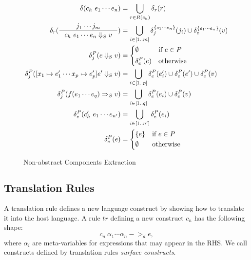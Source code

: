 \begin{figure}
    \begin{align*}
        \delta(c_h~e_1\cdots e_n) & = \bigcup_{r\in R(c_h)} \delta_r(r) \\
        \delta_r(\inference{j_1\cdots j_m}{c_h~e_1\cdots e_n \Da_S v}) & = 
            \bigcup_{i\in [1..m]}\delta_j^{\{e_1\cdots e_n\}}(j_i) \cup \delta_e^{\{e_1\cdots e_n\}}(v) \\
        \delta_j^P(e\Da_S v) & = \left\{ 
            \begin{aligned}
                & \emptyset & & \text{if $e\in P$} \\
                & \delta_e^P(e) & & \text{otherwise}
            \end{aligned}
        \right. \\
        \delta_j^P([x_1\mapsto e'_1 \cdots x_p\mapsto e'_p]e'\Da_S v) & = \bigcup_{i\in [1..p]} \delta_e^P(e'_i) \cup \delta_e^P(e') \cup \delta_e^P(v) \\
        \delta_j^P(f(e_1\cdots e_q)=>_S v) & = \bigcup_{i\in [1..q]} \delta_e^P(e_i) \cup \delta_e^P(v) \\
        \delta_e^P(c_h'~e_1\cdots e_{n'}) & = \bigcup_{i \in [1..n']} \delta_e^P(e_i) \\
        \delta_e^P(e) & = \left\{
            \begin{aligned}
                & \{ e \} & & \text{if $e\in P$} \\
                & \emptyset & & \text{otherwise}
            \end{aligned}
        \right.
    \end{align*}
    \caption{Non-abstract Components Extraction}
    \label{fig:non-abs}
\end{figure}


\subsection{Translation Rules}
\label{sec:translation-rules}

A translation rule defines a new language construct by showing how to translate it into the host language.
A rule $tr$ defining a new construct $c_n$ has the following shape: 
\[ c_n~\alpha_1\cdots \alpha_n ->_d e, \]
where $\alpha_i$ are meta-variables for expressions that may appear in the RHS.
We call constructs defined by translation rules \textit{surface constructs}.

